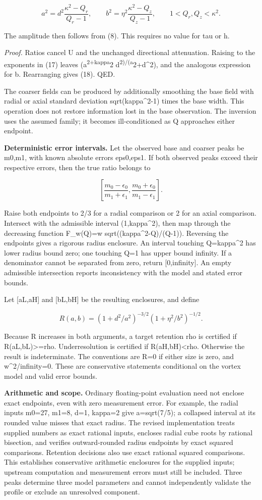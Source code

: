 \documentclass[
]{article}
\begin{document}
\[
a^2=d^2\frac{\kappa^2-Q_r}{Q_r-1},\qquad
b^2=\eta^2\frac{\kappa^2-Q_z}{Q_z-1},\qquad 1<Q_r,Q_z<\kappa^2. \tag{18}
\]

The amplitude then follows from (8). This requires no value for tau or
h.

\emph{Proof.} Ratios cancel U and the unchanged directional attenuation.
Raising to the exponents in (17) leaves (a\textsuperscript{2+kappa}2
d\textsuperscript{2)/(a}2+d\^{}2), and the analogous expression for b.
Rearranging gives (18). QED.

The coarser fields can be produced by additionally smoothing the base
field with radial or axial standard deviation sqrt(kappa\^{}2-1) times
the base width. This operation does not restore information lost in the
base observation. The inversion uses the assumed family; it becomes
ill-conditioned as Q approaches either endpoint.

\textbf{Deterministic error intervals.} Let the observed base and
coarser peaks be m0,m1, with known absolute errors eps0,eps1. If both
observed peaks exceed their respective errors, then the true ratio
belongs to

\[
\left[\frac{m_0-\epsilon_0}{m_1+\epsilon_1},
\frac{m_0+\epsilon_0}{m_1-\epsilon_1}\right]. \tag{19}
\]

Raise both endpoints to 2/3 for a radial comparison or 2 for an axial
comparison. Intersect with the admissible interval (1,kappa\^{}2), then
map through the decreasing function F\_w(Q)=w
sqrt((kappa\^{}2-Q)/(Q-1)). Reversing the endpoints gives a rigorous
radius enclosure. An interval touching Q=kappa\^{}2 has lower radius
bound zero; one touching Q=1 has upper bound infinity. If a denominator
cannot be separated from zero, return {[}0,infinity{]}. An empty
admissible intersection reports inconsistency with the model and stated
error bounds.

Let {[}aL,aH{]} and {[}bL,bH{]} be the resulting enclosures, and define

\[
R(a,b)=(1+d^2/a^2)^{-3/2}(1+\eta^2/b^2)^{-1/2}. \tag{20}
\]

Because R increases in both arguments, a target retention rho is
certified if R(aL,bL)\textgreater=rho. Underresolution is certified if
R(aH,bH)\textless rho. Otherwise the result is indeterminate. The
conventions are R=0 if either size is zero, and w\^{}2/infinity=0. These
are conservative statements conditional on the vortex model and valid
error bounds.

\textbf{Arithmetic and scope.} Ordinary floating-point evaluation need
not enclose exact endpoints, even with zero measurement error. For
example, the radial inputs m0=27, m1=8, d=1, kappa=2 give a=sqrt(7/5); a
collapsed interval at its rounded value misses that exact radius. The
revised implementation treats supplied numbers as exact rational inputs,
encloses radial cube roots by rational bisection, and verifies
outward-rounded radius endpoints by exact squared comparisons. Retention
decisions also use exact rational squared comparisons. This establishes
conservative arithmetic enclosures for the supplied inputs; upstream
computation and measurement errors must still be included. Three peaks
determine three model parameters and cannot independently validate the
profile or exclude an unresolved component.
\end{document}
